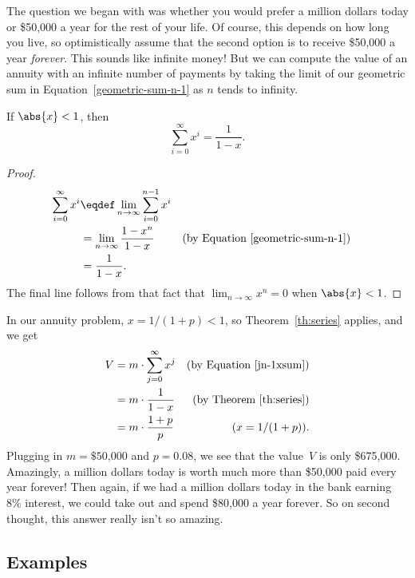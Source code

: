 The question we began with was whether you would prefer a million
dollars today or \$50,000 a year for the rest of your life.  Of
course, this depends on how long you live, so optimistically assume
that the second option is to receive \$50,000 a year \emph{forever}.
This sounds like infinite money!  But we can compute the value of an
annuity with an infinite number of payments by taking the limit of our
geometric sum in Equation~\ref{geometric-sum-n-1} as $n$ tends to
infinity.
\begin{theorem}\label{th:series}
If $\abs{x} < 1$, then
\[
\sum_{i=0}^\infty x^i = \frac{1}{1-x}.
\]
\end{theorem}

\begin{proof}
\begin{align*}
\sum_{i=0}^\infty x^i
   & \eqdef  \lim_{n \rightarrow \infty} \sum_{i=0}^{n-1} x^i \\
   & = \lim_{n \rightarrow \infty} \frac{1 - x^n}{1-x}
        & & \text{(by Equation~\ref{geometric-sum-n-1})}\\
   & = \frac{1}{1-x}.
\end{align*}
The final line follows from that fact that $\lim_{n \rightarrow \infty}
x^n =0$ when $\abs{x} < 1$.
\end{proof}

In our annuity problem, $x=1/(1+p) < 1$, so Theorem~\ref{th:series}
applies, and we get
\begin{align*}
V & = m \cdot \sum_{j=0}^{\infty} x^j & \text{(by Equation~\ref{jn-1xsum})}\\
  &= m\cdot \frac{1}{1-x} & \text{(by Theorem~\ref{th:series})}\\
  &= m\cdot \frac{1 + p}{p} &(x = 1/(1+p)).
\end{align*}
Plugging in $m = \text{\$50,000}$ and $p = 0.08$, we see that the
value~$V$ is only \$675,000.  Amazingly, a million dollars today is
worth much more than \$50,000 paid every year forever!  Then again, if
we had a million dollars today in the bank earning 8\% interest, we
could take out and spend \$80,000 a year forever.  So on second
thought, this answer really isn't so amazing.

\subsection{Examples}

